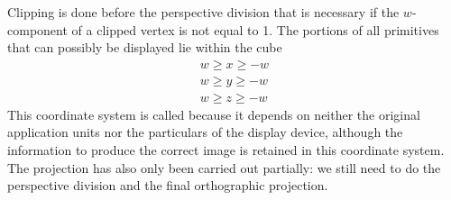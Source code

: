 \documentclass[../COS3712_Notes.tex]{subfiles}
\begin{document}
      Clipping is done before the perspective division that is necessary if the $w$-component
      of a clipped vertex is not equal to 1.
      The portions of all primitives that can possibly be displayed lie within the cube
      \begin{align*}
        w \geq x \geq -w \\
        w \geq y \geq -w \\
        w \geq z \geq -w
      \end{align*}
      This coordinate system is called 
      because it depends on neither the original application units nor the particulars
      of the display device,
      although the information to produce the correct image is retained in this coordinate system.
      The projection has also only been carried out partially: we still need to do the
      perspective division and the final orthographic projection.
\end{document}
